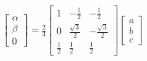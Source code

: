 \begin{gather}
\label{eq:clark}
    \begin{bmatrix}
    \alpha \\ \beta \\ 0
    \end{bmatrix}
    =
    \frac{2}{3}
    \begin{bmatrix}
    1 & -\frac{1}{2} & -\frac{1}{2} \\[0.5em]
    0 & \frac{\sqrt{3}}{2} & -\frac{\sqrt{3}}{2} \\[0.5em]
    \frac{1}{2} & \frac{1}{2} & \frac{1}{2}
    \end{bmatrix}
    \begin{bmatrix}
    a \\ b \\ c
    \end{bmatrix}
\end{gather}